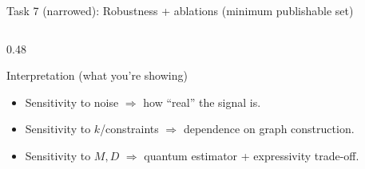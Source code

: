 \documentclass[aspectratio=169,xcolor={dvipsnames}]{beamer}
\begin{document}
\begin{frame}[shrink=38]{Task 7 (narrowed): Robustness + ablations (minimum publishable set)}
\begin{columns}[T,onlytextwidth]
\begin{column}{0.48\textwidth}
\vspace{1mm}
\begin{block}{Interpretation (what you’re showing)}
\begin{itemize}\setlength\itemsep{2pt}
\item Sensitivity to noise $\Rightarrow$ how “real” the signal is.
\item Sensitivity to $k$/constraints $\Rightarrow$ dependence on graph construction.
\item Sensitivity to $M,D$ $\Rightarrow$ quantum estimator + expressivity trade-off.
\end{itemize}
\end{block}
\end{column}

\end{columns}
\end{frame}
\end{document}
